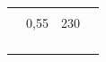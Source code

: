 \begin{table}[]
\begin{tabular*}{\columnwidth}{@{\extracolsep{\fill}}lccl}
                                                                                    &                                                                       &                                            &                                                                                                                                                                                                                                  \\
                                                                                    & 0,55                                                                  & 230                                        &                                                                                                                                                                                                                                  \\
                                                                                    &                                                                       &                                            &                                                                                                                                                                                                                                  \\
                                                                                    &                                                                       &                                            &                                                                                                                                                                                                                                  \\
                                                                                    &                                                                       &                                            &                                                                                                                                                                                                                                  \\
                                                                                    &                                                                       &                                            &                                                                                                                                                                                                                                  \\ \hline

\end{tabular*}
\end{table}
